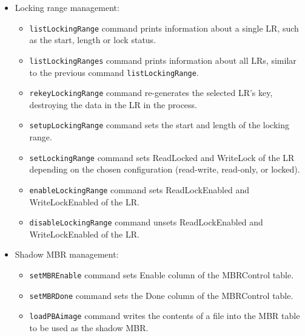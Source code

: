\begin{itemize}
    \item Locking range management: \begin{itemize}
\item \verb|listLockingRange| command prints information about a single LR, such as the start, length or lock status.
\item \verb|listLockingRanges| command prints information about all LRs, similar to the previous command \verb|listLockingRange|.
\item \verb|rekeyLockingRange| command re-generates the selected LR's key, destroying the data in the LR in the process.
\item \verb|setupLockingRange| command sets the start and length of the locking range.
\item \verb|setLockingRange| command sets ReadLocked and WriteLock of the LR depending on the chosen configuration (read-write, read-only, or locked).
\item \verb|enableLockingRange| command sets ReadLockEnabled and WriteLockEnabled of the LR. 
\item \verb|disableLockingRange| command unsets ReadLockEnabled and WriteLockEnabled of the LR. 
    \end{itemize}
    
    \item Shadow MBR management: \begin{itemize}
\item \verb|setMBREnable| command sets Enable column of the MBRControl table.
\item \verb|setMBRDone| command sets the Done column of the MBRControl table.
\item \verb|loadPBAimage| command writes the contents of a file into the MBR table to be used as the shadow MBR.
    \end{itemize}

    

\end{itemize}
